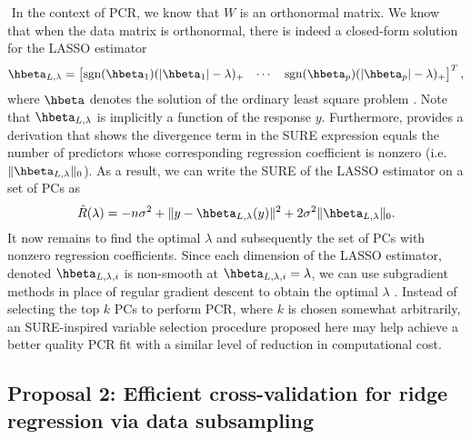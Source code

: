 $ $\newline
In the context of PCR, we know that $W$ is an orthonormal matrix. We know that when the data matrix is orthonormal, there is indeed a closed-form solution for the LASSO estimator
\[
\hbeta_{L,\lambda} = \begin{bmatrix} \sgn(\hbeta_1)(|\hbeta_1| - \lambda)_+ & \cdots & \sgn(\hbeta_p)(|\hbeta_p| - \lambda)_+ \end{bmatrix}^T,
\]
where $\hbeta$ denotes the solution of the ordinary least square problem \citep{gauraha2018introduction}. Note that $\hbeta_{L,\lambda}$ is implicitly a function of the response $y$. Furthermore, \citet{tibshirani2015stein} provides a derivation that shows the divergence term in the SURE expression equals the number of predictors whose corresponding regression coefficient is nonzero (i.e. $\|\hbeta_{L,\lambda}\|_0$). As a result, we can write the SURE of the LASSO estimator on a set of PCs as 
\[
\hat{R}(\lambda) = -n\sigma^2 + \| y - \hbeta_{L,\lambda}(y) \|^2 + 2\sigma^2\|\hbeta_{L,\lambda}\|_0.
\]
It now remains to find the optimal $\lambda$ and subsequently the set of PCs with nonzero regression coefficients. Since each dimension of the LASSO estimator, denoted $\hbeta_{L,\lambda,i}$ is non-smooth at $\hbeta_{L,\lambda,i} = \lambda$, we can use subgradient methods in place of regular gradient descent to obtain the optimal $\lambda$ \citep{shor2012minimization}. Instead of selecting the top $k$ PCs to perform PCR, where $k$ is chosen somewhat arbitrarily, an SURE-inspired variable selection procedure proposed here may help achieve a better quality PCR fit with a similar level of reduction in computational cost.

\pagebreak

\subsection{Proposal 2: Efficient cross-validation for ridge regression via data subsampling} %
